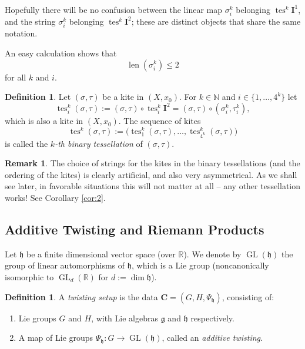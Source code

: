 \documentclass[10pt, a4paper]{amsart}
\theoremstyle{definition}
\newtheorem{dfn}[equation]{Definition}
\newtheorem{rem}[equation]{Remark}
\numberwithin{equation}{section}
\newcommand{\opn}{\operatorname}
\newcommand{\mfrak}[1]{\mathfrak{#1}}
\newcommand{\mbf}[1]{\mathbf{#1}}
\newcommand{\mbb}[1]{\mathbb{#1}}
\newcommand{\R}{\mbb{R}}
\newcommand{\N}{\mbb{N}}
\newcommand{\g}{\mfrak{g}}
\newcommand{\h}{\mfrak{h}}
\begin{document}
Hopefully there will be no confusion between the linear map 
$\sigma^k_i$ belonging $\opn{tes}^k \mbf{I}^1$, and the string 
$\sigma^k_i$ belonging $\opn{tes}^k \mbf{I}^2$; these are distinct objects that
share the same notation. 

An easy calculation shows that
\begin{equation} \label{eqn:127}
\opn{len}(\sigma^k_i) \leq 2
\end{equation}
for all $k$ and $i$.

\begin{dfn} \label{dfn:44}
Let $(\sigma, \tau)$ be a kite in $(X, x_0)$. For $k \in \N$ and 
$i \in \{ 1, \ldots, 4^k \}$ let
\[ \opn{tes}^k_i (\sigma, \tau) := (\sigma, \tau) \circ \opn{tes}^k_i \mbf{I}^2
= (\sigma, \tau) \circ (\sigma^k_i, \tau^k_i) , \]
which is also a kite in $(X, x_0)$.
The sequence of kites
\[ \opn{tes}^k (\sigma, \tau) := 
\bigl( \opn{tes}^k_1 (\sigma, \tau), \ldots, 
\opn{tes}^k_{4^k} (\sigma, \tau) \bigr) \]
is called the {\em $k$-th binary tessellation} of $(\sigma, \tau)$.
\end{dfn}

\begin{rem}
The choice of strings for the kites in the binary tessellations (and
the ordering of the kites) is clearly artificial, and also very
asymmetrical. As we shall see later, in favorable situations this
will not matter at all -- any other tessellation works! See
Corollary \ref{cor:2}.
\end{rem}

\subsection{Additive Twisting and Riemann Products} \label{subsec:rp}
Let $\h$ be a finite dimensional vector space (over $\R$). We denote by
$\opn{GL}(\h)$ the group of linear automorphisms of $\h$, which is a Lie group
(noncanonically isomorphic to $\opn{GL}_d(\R)$ for $d := \opn{dim} \h$).

\begin{dfn} \label{dfn:5}
A {\em twisting setup} is the data 
$\mbf{C} = (G, H, \Psi_{\h})$, consisting of:
\begin{enumerate}
\item Lie groups $G$ and $H$, with Lie algebras $\g$ and $\h$ respectively.
%
\item A map of Lie groups
$\Psi_{\h} : G \to \opn{GL}(\h)$, called an {\em additive twisting}.
\end{enumerate}
\end{dfn}
\end{document}

